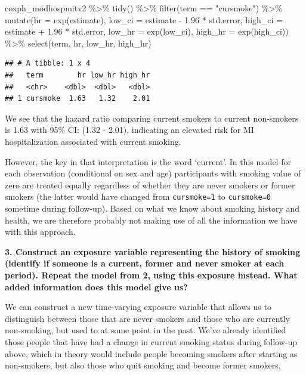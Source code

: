 \documentclass[
]{book}
\newenvironment{Shaded}{\begin{snugshade}}{\end{snugshade}}
\newcommand{\AttributeTok}[1]{\textcolor[rgb]{0.77,0.63,0.00}{#1}}
\newcommand{\FloatTok}[1]{\textcolor[rgb]{0.00,0.00,0.81}{#1}}
\newcommand{\FunctionTok}[1]{\textcolor[rgb]{0.00,0.00,0.00}{#1}}
\newcommand{\NormalTok}[1]{#1}
\newcommand{\SpecialCharTok}[1]{\textcolor[rgb]{0.00,0.00,0.00}{#1}}
\newcommand{\StringTok}[1]{\textcolor[rgb]{0.31,0.60,0.02}{#1}}
\begin{document}
\begin{Shaded}
\begin{Highlighting}[]
\NormalTok{coxph\_modhospmitv2 }\SpecialCharTok{\%\textgreater{}\%} 
  \FunctionTok{tidy}\NormalTok{() }\SpecialCharTok{\%\textgreater{}\%} 
  \FunctionTok{filter}\NormalTok{(term }\SpecialCharTok{==} \StringTok{"cursmoke"}\NormalTok{) }\SpecialCharTok{\%\textgreater{}\%} 
  \FunctionTok{mutate}\NormalTok{(}\AttributeTok{hr =} \FunctionTok{exp}\NormalTok{(estimate),}
         \AttributeTok{low\_ci =}\NormalTok{ estimate }\SpecialCharTok{{-}} \FloatTok{1.96} \SpecialCharTok{*}\NormalTok{ std.error, }
         \AttributeTok{high\_ci =}\NormalTok{ estimate }\SpecialCharTok{+} \FloatTok{1.96} \SpecialCharTok{*}\NormalTok{ std.error, }
         \AttributeTok{low\_hr =} \FunctionTok{exp}\NormalTok{(low\_ci), }
         \AttributeTok{high\_hr =} \FunctionTok{exp}\NormalTok{(high\_ci)) }\SpecialCharTok{\%\textgreater{}\%} 
  \FunctionTok{select}\NormalTok{(term, hr, low\_hr, high\_hr)}
\end{Highlighting}
\end{Shaded}

\begin{verbatim}
## # A tibble: 1 x 4
##   term        hr low_hr high_hr
##   <chr>    <dbl>  <dbl>   <dbl>
## 1 cursmoke  1.63   1.32    2.01
\end{verbatim}

We see that the hazard ratio comparing current smokers to current non-smokers is 1.63 with 95\% CI: (1.32 - 2.01), indicating an elevated risk for MI hospitalization associated with current smoking.

However, the key in that interpretation is the word `current'. In this model for each observation (conditional on sex and age) participants with smoking value of zero are treated equally regardless of whether they are never smokers or former smokers (the latter would have changed from \texttt{cursmoke=1} to \texttt{cursmoke=0} sometime during follow-up). Based on what we know about smoking history and health, we are therefore probably not making use of all the information we have with this approach.

\textbf{3. Construct an exposure variable representing the history of smoking (identify if someone is a current, former and never smoker at each period). Repeat the model from 2, using this exposure instead. What added information does this model give us?}

We can construct a new time-varying exposure variable that allows us to distinguish between those that are never smokers and those who are currently non-smoking, but used to at some point in the past. We've already identified those people that have had a change in current smoking status during follow-up above, which in theory would include people becoming smokers after starting as non-smokers, but also those who quit smoking and become former smokers.
\end{document}
